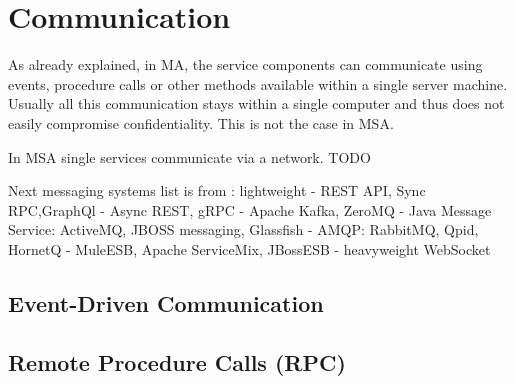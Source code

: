 \section{Communication}
\begin{sloppypar}
    As already explained, in MA, the service components can communicate using 
    events, procedure calls or other methods available within a single server 
    machine. Usually all this communication stays within a single computer and 
    thus does not easily compromise confidentiality. This is not the case in 
    MSA.
\end{sloppypar}




\begin{sloppypar}
    In MSA single services communicate via a network.
    TODO

    Next messaging systems list is from \citep{secchalmsa}:
lightweight
-
    REST API, Sync RPC,GraphQl
    -
    Async REST, gRPC
    - 
    Apache Kafka, ZeroMQ
    -
    Java Message Service: ActiveMQ, JBOSS messaging, Glassfish
    -
    AMQP: RabbitMQ, Qpid, HornetQ
    -
    MuleESB, Apache ServiceMix, JBossESB
-
heavyweight
    WebSocket
\end{sloppypar}

\subsection{Event-Driven Communication}
\begin{sloppypar}
\end{sloppypar}

\subsection{Remote Procedure Calls (RPC)}
\begin{sloppypar}
\end{sloppypar}

